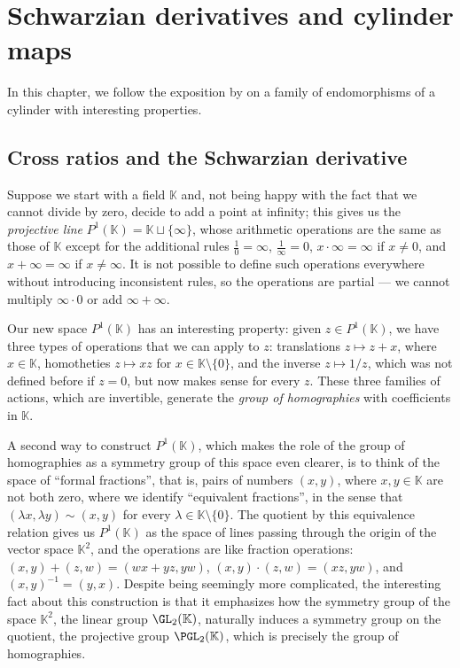 \documentclass[../main]{subfiles}
\begin{document}
\chapter{Schwarzian derivatives and cylinder maps}\label{cha:bonifant-milnor}

In this chapter, we follow the exposition by \textcite{bonifantSchwarzianDerivativesCylinder2008} on a family of endomorphisms of a cylinder with interesting properties.

\section{Cross ratios and the Schwarzian derivative}

Suppose we start with a field \(\mathbb{K}\) and, not being happy with the fact that we cannot divide by zero, decide to add a point at infinity; this gives us the \textit{projective line} \(P^1(\mathbb{K}) = \mathbb{K} \sqcup \{ \infty \}\), whose arithmetic operations are the same as those of \(\mathbb{K}\) except for the additional rules \(\frac{1}{0} = \infty\), \(\frac{1}{\infty} = 0\), \(x \cdot \infty = \infty\) if \(x \neq 0\), and \(x + \infty = \infty\) if \(x \neq \infty\).
It is not possible to define such operations everywhere without introducing inconsistent rules, so the operations are partial --- we cannot multiply \(\infty \cdot 0\) or add \(\infty + \infty\).

Our new space \(P^1(\mathbb{K})\) has an interesting property: given \(z \in P^1(\mathbb{K})\), we have three types of operations that we can apply to \(z\): translations \(z \mapsto z + x\), where \(x \in \mathbb{K}\), homotheties \(z \mapsto xz\) for \(x \in \mathbb{K} \setminus \{ 0 \}\), and the inverse \(z \mapsto 1/z\), which was not defined before if \(z = 0\), but now makes sense for every \(z\). These three families of actions, which are invertible, generate the \textit{group of homographies} with coefficients in \(\mathbb{K}\).

A second way to construct \(P^1(\mathbb{K})\), which makes the role of the group of homographies as a symmetry group of this space even clearer, is to think of the space of ``formal fractions'', that is, pairs of numbers \((x,y)\), where \(x, y \in \mathbb{K}\) are not both zero, where we identify ``equivalent fractions'', in the sense that \((\lambda x, \lambda y) \sim (x, y)\) for every \(\lambda \in \mathbb{K} \setminus \{ 0 \}\). The quotient by this equivalence relation gives us \(P^1(\mathbb{K})\) as the space of lines passing through the origin of the vector space \(\mathbb{K}^2\), and the operations are like fraction operations: \((x,y) + (z,w) = (wx + yz, yw)\), \((x,y) \cdot (z,w) = (xz, yw)\), and \((x,y)^{-1} = (y,x)\). Despite being seemingly more complicated, the interesting fact about this construction is that it emphasizes how the symmetry group of the space \(\mathbb{K}^2\), the linear group \(\GL_2(\mathbb{K})\), naturally induces a symmetry group on the quotient, the projective group \(\PGL_2(\mathbb{K})\), which is precisely the group of homographies.
\end{document}
